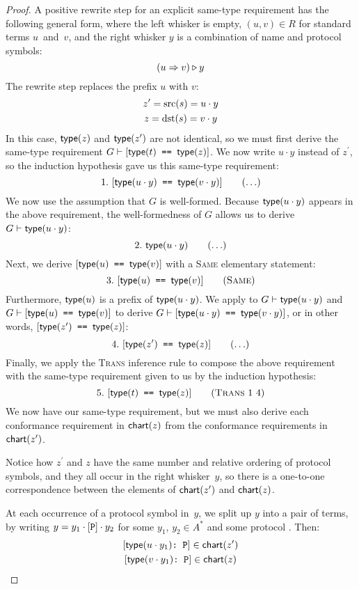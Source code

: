 \documentclass[../generics]{subfiles}
\begin{document}
\begin{proof}
 A positive rewrite step for an explicit same-type requirement has the following general form, where the left whisker is empty, $(u,v)\in R$ for standard terms $u$~and~$v$, and the right whisker $y$ is a combination of name and protocol symbols:
\[(u\Rightarrow v)\triangleright y\]
The rewrite step replaces the prefix $u$ with $v$:
\begin{gather*}
z^\prime=\operatorname{src}(s)=u\cdot y\\
z=\operatorname{dst}(s)=v\cdot y
\end{gather*}
In this case, $\mathsf{type}(z)$ and $\mathsf{type}(z^\prime)$ are not identical, so we must first derive the same-type requirement $G\vdash[\texttt{$\mathsf{type}(t)$ == $\mathsf{type}(z)$}]$. We now write $u\cdot y$ instead of $z^\prime$, so the induction hypothesis gave us this same-type requirement:
\[ \AnyStep{\SameReq{$\Type(u\cdot y)$}{$\Type(v\cdot y)$}}{1} \]
We now use the assumption that $G$ is well-formed. Because $\mathsf{type}(u\cdot y)$ appears in the above requirement, the well-formedness of $G$ allows us to derive $G\vdash\mathsf{type}(u\cdot y)$:
\[ \AnyStep{\Type(u\cdot y)}{2} \]
Next, we derive $[\texttt{$\mathsf{type}(u)$ == $\mathsf{type}(v)$}]$ with a \textsc{Same} elementary statement:
\[ \SameStep{$\Type(u)$}{$\Type(v)$}{3} \]
Furthermore, $\mathsf{type}(u)$ is a prefix of $\mathsf{type}(u\cdot y)$. We apply  to $G\vdash\texttt{$\mathsf{type}(u\cdot y)$}$ and $G\vdash[\texttt{$\mathsf{type}(u)$ == $\mathsf{type}(v)$}]$ to derive $G\vdash[\texttt{$\mathsf{type}(u\cdot y)$ == $\mathsf{type}(v\cdot y)$}]$, or in other words, $[\texttt{$\mathsf{type}(z^\prime)$ == $\mathsf{type}(z)$}]$:
\[
\AnyStep{\SameReq{$\Type(z^\prime)$}{$\Type(z)$}}{4}
\]
Finally, we apply the \textsc{Trans} inference rule to compose the above requirement with the same-type requirement given to us by the induction hypothesis:
\[
\TransStep{1}{4}{$\Type(t)$}{$\Type(z)$}{5}
\]
We now have our same-type requirement, but we must also derive each conformance requirement in $\mathsf{chart}(z)$ from the conformance requirements in $\mathsf{chart}(z^\prime)$.

Notice how $z^\prime$ and $z$ have the same number and relative ordering of protocol symbols, and they all occur in the right whisker~$y$, so there is a one-to-one correspondence between the elements of $\mathsf{chart}(z^\prime)$ and $\mathsf{chart}(z)$.

At each occurrence of a protocol symbol in~$y$, we split up $y$ into a pair of terms, by writing $y=y_1\cdot[\texttt{P}]\cdot y_2$ for some $y_1$, $y_2\in A^*$ and some protocol \tP. Then:
\begin{gather*}
\ConfReq{$\Type(u\cdot y_1)$}{P}\in\Chart(z^\prime)\\
\ConfReq{$\Type(v\cdot y_1)$}{P}\in\Chart(z)
\end{gather*}


\end{proof}
\end{document}

